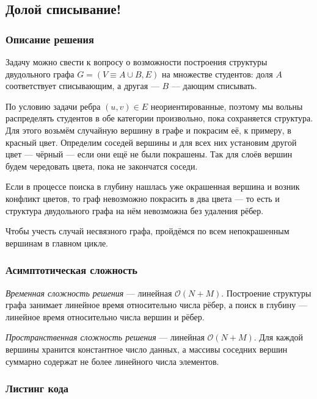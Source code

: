 \subsection{Долой списывание!}

\subsubsection{Описание решения}

Задачу можно свести к вопросу о возможности построения структуры двудольного графа \( G=(V\equiv A\cup B,E) \) на множестве студентов: доля \( A \) соответствует списывающим, а другая --- \( B \) --- дающим списывать. 

По условию задачи ребра \( (u,v)\in E \) неориентированные, поэтому мы вольны распределять студентов в обе категории произвольно, пока сохраняется структура. Для этого возьмём случайную вершину в графе и покрасим её, к примеру, в красный цвет. Определим соседей вершины и для всех них установим другой цвет --- чёрный --- если они ещё не были покрашены. Так для слоёв вершин будем чередовать цвета, пока не закончатся соседи.

Если в процессе поиска в глубину нашлась уже окрашенная вершина и возник конфликт цветов, то граф невозможно покрасить в два цвета --- то есть и структура двудольного графа на нём невозможна без удаления рёбер.

Чтобы учесть случай несвязного графа, пройдёмся по всем непокрашенным вершинам в главном цикле.

\subsubsection{Асимптотическая сложность}

\textit{Временная сложность решения} --- линейная \( \mathcal{O}(N+M) \). Построение структуры графа занимает линейное время относительно числа рёбер, а поиск в глубину --- линейное время относительно числа вершин и рёбер.

\textit{Пространственная сложность решения} --- линейная \( \mathcal{O}(N+M) \). Для каждой вершины хранится константное число данных, а массивы соседних вершин суммарно содержат не более линейного числа элементов.

\subsubsection{Листинг кода}

